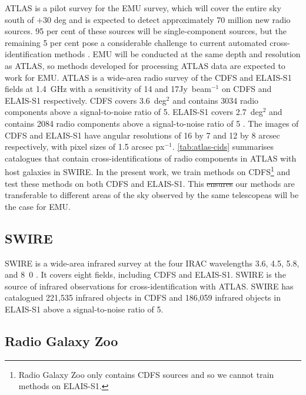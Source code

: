 \documentclass[11pt, a4paper]{book}
\newcommand{\jansky}{Jy}
\providecommand{\DIFaddtex}[1]{{\protect\color{blue}\uwave{#1}}} %
\providecommand{\DIFdeltex}[1]{{\protect\color{red}\sout{#1}}}                      %
\providecommand{\DIFaddbegin}{} %
\providecommand{\DIFaddend}{} %
\providecommand{\DIFdelbegin}{} %
\providecommand{\DIFdelend}{} %
\providecommand{\DIFadd}[1]{\texorpdfstring{\DIFaddtex{#1}}{#1}} %
\providecommand{\DIFdel}[1]{\texorpdfstring{\DIFdeltex{#1}}{}} %
\newcommand{\DIFscaledelfig}{0.5}
\newlength{\DIFdelgraphicswidth} %
\newlength{\DIFdelgraphicsheight} %
\newcommand{\DIFaddincludegraphics}[2][]{{\color{blue}\fbox{\DIFOincludegraphics[#1]{#2}}}} %
\newcommand{\DIFdelincludegraphics}[2][]{%
\sbox{\DIFdelgraphicsbox}{\DIFOincludegraphics[#1]{#2}}%
\settoboxwidth{\DIFdelgraphicswidth}{\DIFdelgraphicsbox} %
\settoboxtotalheight{\DIFdelgraphicsheight}{\DIFdelgraphicsbox} %
\scalebox{\DIFscaledelfig}{%
\parbox[b]{\DIFdelgraphicswidth}{\usebox{\DIFdelgraphicsbox}\\[-\baselineskip] \rule{\DIFdelgraphicswidth}{0em}}\llap{\resizebox{\DIFdelgraphicswidth}{\DIFdelgraphicsheight}{%
\setlength{\unitlength}{\DIFdelgraphicswidth}%
\begin{picture}(1,1)%
\thicklines\linethickness{2pt} %
{\color[rgb]{1,0,0}\put(0,0){\framebox(1,1){}}}%
{\color[rgb]{1,0,0}\put(0,0){\line( 1,1){1}}}%
{\color[rgb]{1,0,0}\put(0,1){\line(1,-1){1}}}%
\end{picture}%
}\hspace*{3pt}}} %
} %
\DeclareRobustCommand{\DIFaddbegin}{\DIFOaddbegin \let\includegraphics\DIFaddincludegraphics} %
\DeclareRobustCommand{\DIFaddend}{\DIFOaddend \let\includegraphics\DIFOincludegraphics} %
\DeclareRobustCommand{\DIFdelbegin}{\DIFOdelbegin \let\includegraphics\DIFdelincludegraphics} %
\DeclareRobustCommand{\DIFdelend}{\DIFOaddend \let\includegraphics\DIFOincludegraphics} %
\begin{document}
    ATLAS is a pilot survey for the EMU \citep{norris11} survey, which will
    cover the entire sky south of $+30$ deg and is expected to detect
    approximately 70 million new radio sources. {95 per cent of these sources
    will be single-component sources, but the remaining 5 per cent pose a
    considerable challenge to current automated cross-identification methods
    \citep{norris11}.} EMU will be conducted at the same depth and resolution
    as ATLAS, so methods developed for processing ATLAS data are expected to
    work for EMU. ATLAS is a wide-area radio survey of the CDFS and ELAIS-S1
    fields at 1.4~GHz with a sensitivity of 14 and
    \unit{17}{\micro\jansky}~beam$^{-1}$ on CDFS and ELAIS-S1 respectively.
    CDFS covers 3.6~deg$^2$ and contains 3034 radio components above a
    signal-to-noise ratio of 5. ELAIS-S1 covers 2.7~deg$^2$ and contains 2084
    radio components above a signal-to-noise ratio of 5 \citep{franzen15}. The
    images of CDFS and ELAIS-S1 have angular resolutions of 16 by 7 and 12 by
    8 arcsec respectively, with pixel sizes of 1.5 arcsec px$^{-1}$.
    \autoref{tab:atlas-cids} summarises catalogues that contain
    cross-identifications of radio components in ATLAS with host galaxies in
    SWIRE. In the present work, we train methods on
    CDFS\footnote{{Radio Galaxy Zoo only contains CDFS sources and so
    we cannot train methods on ELAIS-S1.}} and test these methods on both CDFS
    and ELAIS-S1. This \DIFdelbegin \DIFdel{ensures }\DIFdelend \DIFaddbegin \DIFadd{helps confirm that }\DIFaddend our methods are transferable to different
    areas of the sky observed by the same telescope\DIFaddbegin \DIFadd{, }\DIFaddend as will be the case for
    EMU.

  \subsection{SWIRE}\label{sec:atlas-xid-swire}

    SWIRE is a wide-area infrared
    survey at the four IRAC wavelengths 3.6, 4.5, 5.8, and
    \unit{8.0}{\micro\meter} \citep{lonsdale03swire, surace05swire}. It covers eight fields, including CDFS and ELAIS-S1. SWIRE is the source of infrared
    observations for cross-identification with ATLAS. SWIRE has catalogued 221,535
    infrared objects in CDFS and 186,059 infrared objects in ELAIS-S1 above a signal-to-noise ratio of 5.

  \subsection{Radio Galaxy Zoo}\label{sec:atlas-xid-rgz}
\end{document}
